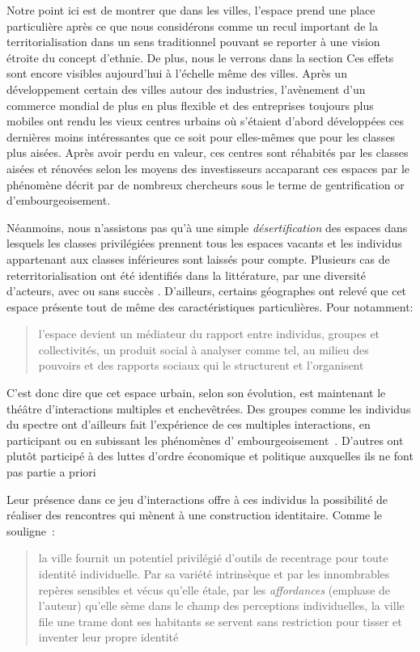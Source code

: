 Notre point ici est de montrer que dans les villes, l'espace prend une place particulière après ce que nous considérons comme un recul important de la territorialisation dans un sens traditionnel pouvant se reporter à une vision étroite du concept d'ethnie. 
De plus, nous le verrons dans la section  
Ces effets sont encore visibles aujourd'hui à l'échelle même des villes. 
Après un développement certain des villes autour des industries, l'avènement d'un commerce mondial de plus en plus flexible et des entreprises toujours plus mobiles ont rendu les vieux centres urbains où s'étaient d'abord développées ces dernières moins intéressantes que ce soit pour elles-mêmes que pour les classes plus aisées. 
Après avoir perdu en valeur, ces centres sont réhabités par les classes aisées et rénovées selon les moyens des investisseurs accaparant ces espaces par le phénomène décrit par de nombreux chercheurs sous le terme de gentrification or d'embourgeoisement.

Néanmoins, nous n'assistons pas qu'à une simple \emph{désertification} des espaces dans lesquels les classes privilégiées prennent tous les espaces vacants et les individus appartenant aux classes inférieures sont laissés pour compte.
Plusieurs cas de reterritorialisation ont été identifiés dans la littérature, par une diversité d'acteurs, avec ou sans succès \citet{Hatvany2005}. 
D'ailleurs, certains géographes ont relevé que cet espace présente tout de même des caractéristiques particulières. 
Pour \citeauthor{Courville1991} notamment: \blockquote[{\cite[41]{Courville1991}}][.]{l'espace devient un médiateur du rapport entre individus, groupes et collectivités, un produit social à analyser comme tel, au milieu des pouvoirs et des rapports sociaux qui le structurent et l'organisent}.

C'est donc dire que cet espace urbain, selon son évolution, est maintenant le théâtre d'interactions multiples et enchevêtrées. 
Des groupes comme les individus du spectre \lgbt{} ont d'ailleurs fait l'expérience de ces multiples interactions, en participant ou en subissant les phénomènes d’ embourgeoisement~\autocite{Podmore2001,Giraud2014,Hogan2005}. 
D'autres ont plutôt participé à des luttes d'ordre économique et politique auxquelles ils ne font pas partie a priori~\autocite{Kelliher2014} 

Leur présence dans ce jeu d'interactions offre à ces individus la possibilité de réaliser des rencontres qui mènent à une construction identitaire. 
Comme le souligne~\citeauthor{DiMeo2007}: \blockquote[{\cite[81]{DiMeo2007}}][.]{\textelp{} la ville fournit un potentiel privilégié d’outils de recentrage pour toute identité individuelle. Par sa variété intrinsèque et par les innombrables repères sensibles et vécus qu’elle étale, par les \emph{affordances} (emphase de l'auteur) qu’elle sème dans le champ des perceptions individuelles, la ville file une trame dont ses habitants se servent sans restriction pour tisser et inventer leur propre identité}.

